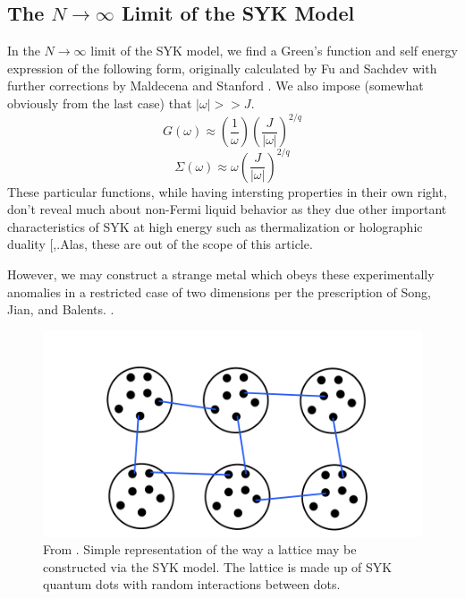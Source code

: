\documentclass[reprint]{revtex4-2}
\begin{document}
\subsection{The $N \rightarrow \infty$ Limit of the SYK Model}

\par In the $N \rightarrow \infty$ limit of the SYK model, we find a Green's function and self energy expression of the following form, originally calculated by Fu and Sachdev \cite{Fu_2016}  with further corrections by Maldecena and Stanford \cite{Maldacena_2016}. We also impose (somewhat obviously from the last case) that $|\omega| >> J$. 
\begin{equation}
    G(\omega) \approx (\frac{1}{\omega})(\frac{J}{|\omega|})^{2/q}
\end{equation}
\begin{equation}
    \Sigma(\omega) \approx \omega(\frac{J}{|\omega|})^{2/q}
\end{equation}
These particular functions, while having intersting properties in their own right, don't reveal much about non-Fermi liquid behavior as they due other important characteristics of SYK at high energy such as thermalization or holographic duality [\cite{Jevicki_2016},\cite{Jevicki_2022}.Alas, these are out of the scope of this article. 
\par However, we may construct a strange metal which obeys these experimentally anomalies in a restricted case of two dimensions per the prescription of Song, Jian, and Balents. \cite{Song_2017}.
\begin{figure}[H] 
    \centering
    \includegraphics{SYKLattice.png}
    \caption{From \cite{Rosenhaus:2018dtp}. Simple representation of the way a lattice may be constructed via the SYK model. The lattice is made up of SYK quantum dots with random interactions between dots.}
    \label{fig:5}
\end{figure}
\end{document}
